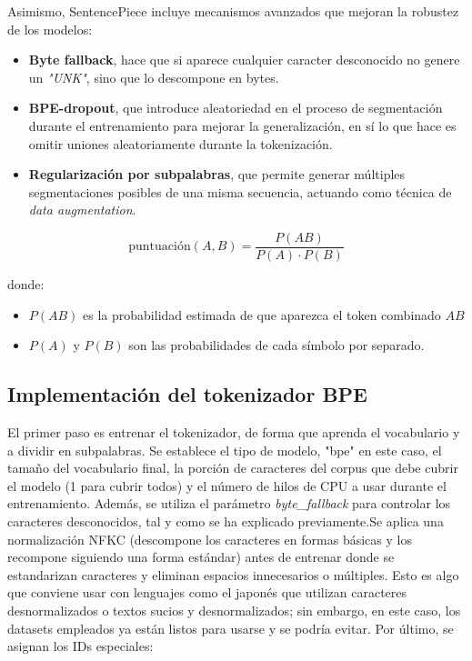\documentclass[11pt]{book}
\theoremstyle{plain}
\theoremstyle{definition}
\begin{document}
Asimismo, SentencePiece incluye mecanismos avanzados que mejoran la robustez de los modelos: 
\begin{itemize}
    \item \textbf{Byte fallback}, hace que si aparece cualquier caracter desconocido no genere un \textit{"UNK"}, sino que lo descompone en bytes.
    \item \textbf{BPE-dropout}, que introduce aleatoriedad en el proceso de segmentación durante el entrenamiento para mejorar la generalización, en sí lo que hace es omitir uniones aleatoriamente durante la tokenización.
    \item \textbf{Regularización por subpalabras}, que permite generar múltiples segmentaciones posibles de una misma secuencia, actuando como técnica de \textit{data augmentation}.
\end{itemize}


\[
\text{puntuación}(A,B) = \frac{P(AB)}{P(A) \cdot P(B)}
\]

donde:
\begin{itemize}
    \item $P(AB)$ es la probabilidad estimada de que aparezca el token combinado $AB$
    \item $P(A)$ y $P(B)$ son las probabilidades de cada símbolo por separado.
\end{itemize}
\text{\#\#\#\#\#\#\#\#\#\#\#\#\#\#\#\#\#\#\#\#\#\#\#\#\#\#\#\#\#\#\#\#\#}

\subsection{Implementación del tokenizador BPE}
El primer paso es entrenar el tokenizador, de forma que aprenda el vocabulario y a dividir en subpalabras. Se establece el tipo de modelo, "bpe" en este caso, el tamaño del vocabulario final, la porción de caracteres del corpus que debe cubrir el modelo (1 para cubrir todos) y el número de hilos de CPU a usar durante el entrenamiento. Además, se utiliza el parámetro \textit{byte\_fallback} para controlar los caracteres desconocidos, tal y como se ha explicado previamente.Se aplica una normalización NFKC (descompone los caracteres en formas básicas y los recompone siguiendo una forma estándar) antes de entrenar donde se estandarizan caracteres y eliminan espacios innecesarios o múltiples. Esto es algo que conviene usar con lenguajes como el japonés que utilizan caracteres desnormalizados o textos sucios y desnormalizados; sin embargo, en este caso, los datasets empleados ya están listos para usarse y se podría evitar. Por último, se asignan los IDs especiales:
\end{document}
